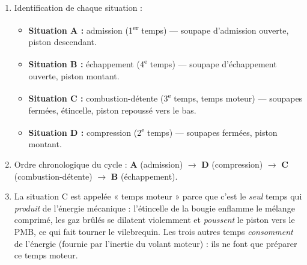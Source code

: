 \documentclass[11pt]{article}
\newcommand{\cle}[1]{{\popxbold\color{popdark}#1}}
\begin{document}
\begin{corrige}
\begin{enumerate}
\item Identification de chaque situation :
\begin{itemize}
\item \textbf{Situation A :} \cle{admission} (1\textsuperscript{er} temps) — soupape d'admission ouverte, piston descendant.
\item \textbf{Situation B :} \cle{échappement} (4\textsuperscript{e} temps) — soupape d'échappement ouverte, piston montant.
\item \textbf{Situation C :} \cle{combustion-détente} (3\textsuperscript{e} temps, temps moteur) — soupapes fermées, étincelle, piston repoussé vers le bas.
\item \textbf{Situation D :} \cle{compression} (2\textsuperscript{e} temps) — soupapes fermées, piston montant.
\end{itemize}
\item Ordre chronologique du cycle : \textbf{A} (admission) $\rightarrow$ \textbf{D} (compression) $\rightarrow$ \textbf{C} (combustion-détente) $\rightarrow$ \textbf{B} (échappement).
\item La situation C est appelée « \cle{temps moteur} » parce que c'est le \emph{seul} temps qui \emph{produit} de l'énergie mécanique : l'étincelle de la bougie enflamme le mélange comprimé, les gaz brûlés se dilatent violemment et \emph{poussent} le piston vers le PMB, ce qui fait tourner le vilebrequin. Les trois autres temps \emph{consomment} de l'énergie (fournie par l'inertie du volant moteur) : ils ne font que préparer ce temps moteur.
\end{enumerate}
\end{corrige}
\end{document}

